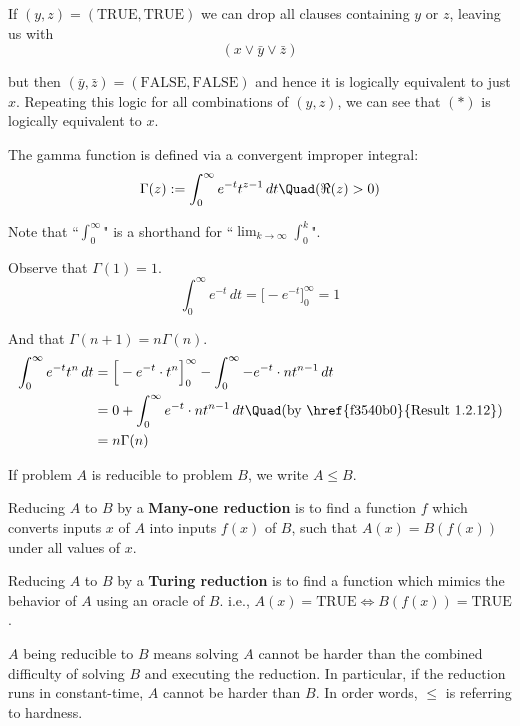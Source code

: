 If $(y,z)=(\text{TRUE},\text{TRUE})$ we can drop all clauses
containing $y$ or $z$, leaving us with
$$
	(x\lor \bar y\lor\bar z)
$$

but then $(\bar y,\bar z)=(\text{FALSE},\text{FALSE})$ and hence it is
logically equivalent to just $x$.
Repeating this logic for all combinations of $(y,z)$, we can see that
$(*)$ is logically equivalent to $x$.


\label{ce1fa3f}

The gamma function is defined via a convergent improper integral:
$$
	\Gamma(z):=\int_0^\infty e^{-t}t^{z-1}\,dt\Quad(\Re(z)>0)
$$

Note that ``$\displaystyle\int_0^\infty$" is a shorthand for
``$\displaystyle\lim_{k\to\infty}\int_0^k$".

Observe that $\Gamma(1)=1$.
$$\int_0^\infty e^{-t}\,dt=\Big[-e^{-t}\Big]_0^\infty=1$$

And that $\Gamma(n+1)=n\Gamma(n)$.
\begin{align*}
	\int_0^\infty e^{-t}t^n\,dt
	 & = \Big[-e^{-t}\cdot t^n\Big]_0^\infty-\int_0^\infty-e^{-t}\cdot nt^{n-1}\,dt              \\
	 & = 0+\int_0^\infty e^{-t}\cdot nt^{n-1}\,dt \Quad\text{(by \href{f3540b0}{Result 1.2.12})} \\
	 & = n\Gamma(n)
\end{align*}

\label{e009acb}

If problem $A$ is reducible to problem $B$, we write $A\leq B$.

Reducing $A$ to $B$ by a \textbf{Many-one reduction} is to find a
function $f$ which converts inputs $x$ of $A$ into inputs $f(x)$ of
$B$, such that $A(x)=B(f(x))$ under all values of $x$.

Reducing $A$ to $B$ by a \textbf{Turing reduction} is to find a
function which mimics the behavior of $A$ using an oracle of $B$.
i.e., $A(x)=\text{TRUE}\iff B(f(x))=\text{TRUE}$.

$A$ being reducible to $B$ means solving $A$ cannot be harder than the
combined difficulty of solving $B$ and executing the reduction. In
particular, if the reduction runs in constant-time, $A$ cannot be
harder than $B$. In order words, $\leq$ is referring to hardness.

